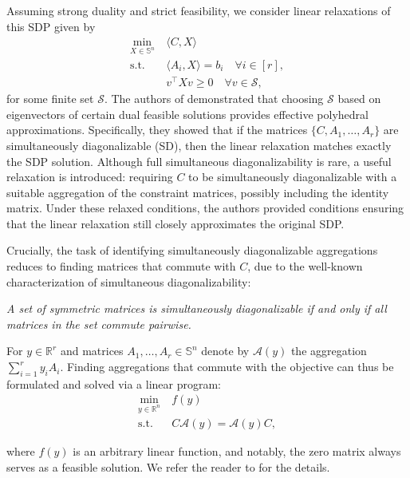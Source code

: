 \documentclass{article}
\begin{document}
Assuming strong duality and strict feasibility, we consider linear relaxations of this SDP given by
\begin{equation}
\begin{aligned}
\min_{X\in \mathbb{S}^{n}} \ & \langle C,X\rangle \\
\text{s.t. } & \langle A_i,X \rangle = b_i \quad \forall i \in [r], \\
& v^\top X v \geq 0 \quad \forall v \in \mathcal{S},
\end{aligned}
\end{equation}
for some finite set $\mathcal{S}$. The authors of \cite{de2023instance} demonstrated that choosing $\mathcal{S}$ based on eigenvectors of certain dual feasible solutions provides effective polyhedral approximations.
Specifically, they showed that if the matrices $\{C, A_1, \dots, A_r\}$ are simultaneously diagonalizable (SD), then the linear relaxation matches exactly the SDP solution. Although full simultaneous diagonalizability is rare, a useful relaxation is introduced: requiring $C$ to be simultaneously diagonalizable with a suitable aggregation of the constraint matrices, possibly including the identity matrix. Under these relaxed conditions, the authors provided conditions ensuring that the linear relaxation still closely approximates the original SDP.

Crucially, the task of identifying simultaneously diagonalizable aggregations reduces to finding matrices that commute with $C$, due to the well-known characterization of simultaneous diagonalizability:

\emph{A set of symmetric matrices is simultaneously diagonalizable if and only if all matrices in the set commute pairwise.}

For $y\in \mathbb{R}^r$ and matrices $A_1,\dots,A_r \in \mathbb{S}^n$ denote by $\mathcal{A}(y)$ the aggregation 
$\sum_{i=1}^ry_iA_i$. Finding aggregations that commute with the objective can thus be formulated and solved via a linear program:
\begin{equation}
\label{prog_commute}
\begin{aligned}
    \min_{y\in \mathbb{R}^{n}} \ & f(y) \\
    \text{s.t. } & C\mathcal{A}(y) = \mathcal{A}(y)C,
\end{aligned}
\end{equation}

where $f(y)$ is an arbitrary linear function, and notably, the zero matrix always serves as a feasible solution. We refer the reader to 
\cite{de2023instance} for the details. 
\end{document}
